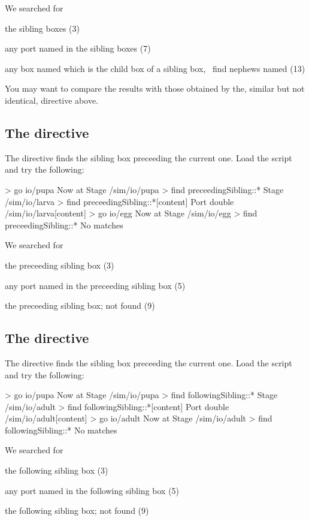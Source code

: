 \noindent
We searched for 
\begin{compactitem}
\item the sibling boxes (3)
\item any port named  in the sibling boxes (7)
\item any box named  which is the child box of a sibling box, \ie\ find nephews named  (13)
\end{compactitem}

You may want to compare the results with those obtained by the, similar but not identical,  directive above.

%
%
\subsection{The  directive}
The  directive finds the sibling box preceeding the current one. Load the  script and try the following:

\lstset{numbers=left}
\begin{usdialog}
> go io/pupa
Now at Stage /sim/io/pupa
> find preceedingSibling::*
Stage /sim/io/larva
> find preceedingSibling::*[content]
Port double /sim/io/larva[content]
> go io/egg
Now at Stage /sim/io/egg
> find preceedingSibling::*
No matches
\end{usdialog}
\lstset{numbers=none}

\noindent
We searched for 
\begin{compactitem}
\item the preceeding sibling box (3)
\item any port named  in the preceeding sibling box (5)
\item the preceeding sibling box; not found (9)
\end{compactitem}

%
%
\subsection{The  directive}
The  directive finds the sibling box preceeding the current one. Load the  script and try the following:

\lstset{numbers=left}
\begin{usdialog}
> go io/pupa
Now at Stage /sim/io/pupa
> find followingSibling::*
Stage /sim/io/adult
> find followingSibling::*[content]
Port double /sim/io/adult[content]
> go io/adult
Now at Stage /sim/io/adult
> find followingSibling::*
No matches
\end{usdialog}
\lstset{numbers=none}

\noindent
We searched for 
\begin{compactitem}
\item the following sibling box (3)
\item any port named  in the following sibling box (5)
\item the following sibling box; not found (9)
\end{compactitem}

